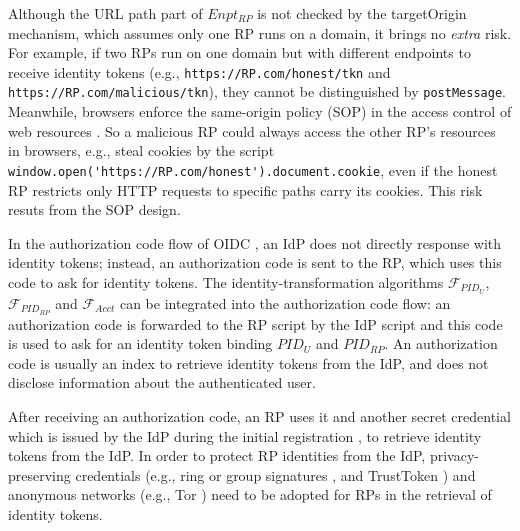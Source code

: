Although the URL path part of $Enpt_{RP}$ %
 is not checked by the targetOrigin mechanism,
  which assumes only one RP runs on a domain,
   it brings no \emph{extra} risk.
For example, if two RPs run on one domain but with different endpoints to receive identity tokens
        (e.g., \verb+https://RP.com/honest/tkn+ and \verb+https://RP.com/malicious/tkn+),
         they cannot be distinguished by \verb+postMessage+.
Meanwhile, browsers enforce
 the same-origin policy (SOP) in the access control of web resources \cite{sop}.
So
    a malicious RP could always access the other RP's resources in browsers,
        e.g., steal cookies
        by the script
        \verb+window.open('https://RP.com/honest').document.cookie+,
    even if the honest RP restricts only HTTP requests to specific paths carry its cookies.
This risk resuts from the SOP design.


\vspace{0.4mm}
In the authorization code flow of OIDC \cite{OpenIDConnect},
    an IdP does not directly response with identity tokens;
        instead,
            an authorization code is sent to the RP,
            which uses this code to ask for identity tokens.
The identity-transformation algorithms $\mathcal{F}_{PID_{U}}$, $\mathcal{F}_{PID_{RP}}$ and $\mathcal{F}_{Acct}$
    can be integrated into the authorization code flow:
            an authorization code is forwarded to the RP script by the IdP script
                and this code is used to ask for an identity token binding $PID_U$ and $PID_{RP}$.
An authorization code is usually an index to retrieve identity tokens from the IdP,
        and does not disclose information about the authenticated user.


After receiving an authorization code, an RP uses it and another secret credential
         which is issued by the IdP during the initial registration \cite{OpenIDConnect},
     to retrieve identity tokens from the IdP.
In order to protect RP identities from the IdP,
        privacy-preserving credentials (e.g., ring or group signatures \cite{ring-sig,chaum1991group}, and TrustToken \cite{trusttoken})
        and anonymous networks (e.g., Tor \cite{tor}) need to be adopted for RPs in the retrieval of identity tokens.





